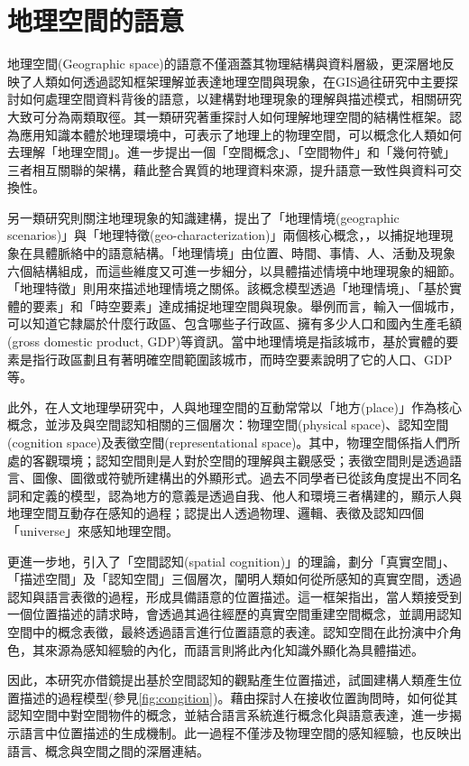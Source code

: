 \section{地理空間的語意}

地理空間(Geographic space)的語意不僅涵蓋其物理結構與資料層級，更深層地反映了人類如何透過認知框架理解並表達地理空間與現象，在GIS過往研究中主要探討如何處理空間資料背後的語意，以建構對地理現象的理解與描述模式，相關研究大致可分為兩類取徑。其一類研究著重探討人如何理解地理空間的結構性框架。\citet{RN25}認為應用知識本體於地理環境中，可表示了地理上的物理空間，可以概念化人類如何去理解「地理空間」。\citet{RN43}進一步提出一個「空間概念」、「空間物件」和「幾何符號」三者相互關聯的架構，藉此整合異質的地理資料來源，提升語意一致性與資料可交換性。

另一類研究則關注地理現象的知識建構，\citet{RN161}提出了「地理情境(geographic scenarios)」與「地理特徵(geo-characterization)」兩個核心概念，，以捕捉地理現象在具體脈絡中的語意結構。「地理情境」由位置、時間、事情、人、活動及現象六個結構組成，而這些維度又可進一步細分，以具體描述情境中地理現象的細節。「地理特徵」則用來描述地理情境之關係。該概念模型透過「地理情境」、「基於實體的要素」和「時空要素」達成捕捉地理空間與現象。舉例而言，輸入一個城市，可以知道它隸屬於什麼行政區、包含哪些子行政區、擁有多少人口和國內生產毛額(gross domestic product, GDP)等資訊。當中地理情境是指該城市，基於實體的要素是指行政區劃且有著明確空間範圍該城市，而時空要素說明了它的人口、GDP等。

此外，在人文地理學研究中，人與地理空間的互動常常以「地方(place)」作為核心概念，並涉及與空間認知相關的三個層次：物理空間(physical space)、認知空間(cognition space)及表徵空間(representational space)。其中，物理空間係指人們所處的客觀環境；認知空間則是人對於空間的理解與主觀感受；表徵空間則是透過語言、圖像、圖徵或符號所建構出的外顯形式。過去不同學者已從該角度提出不同名詞和定義的模型，\citet{RN131}認為地方的意義是透過自我、他人和環境三者構建的，顯示人與地理空間互動存在感知的過程；\citet{RN57}認提出人透過物理、邏輯、表徵及認知四個「universe」來感知地理空間。

更進一步地，\citet{RN128}引入了「空間認知(spatial cognition)」的理論，劃分「真實空間」、「描述空間」及「認知空間」三個層次，闡明人類如何從所感知的真實空間，透過認知與語言表徵的過程，形成具備語意的位置描述。這一框架指出，當人類接受到一個位置描述的請求時，會透過其過往經歷的真實空間重建空間概念，並調用認知空間中的概念表徵，最終透過語言進行位置語意的表達。認知空間在此扮演中介角色，其來源為感知經驗的內化，而語言則將此內化知識外顯化為具體描述。

因此，本研究亦借鏡\citet{RN128}提出基於空間認知的觀點產生位置描述，試圖建構人類產生位置描述的過程模型(參見\ref{fig:congition})。藉由探討人在接收位置詢問時，如何從其認知空間中對空間物件的概念，並結合語言系統進行概念化與語意表達，進一步揭示語言中位置描述的生成機制。此一過程不僅涉及物理空間的感知經驗，也反映出語言、概念與空間之間的深層連結。

